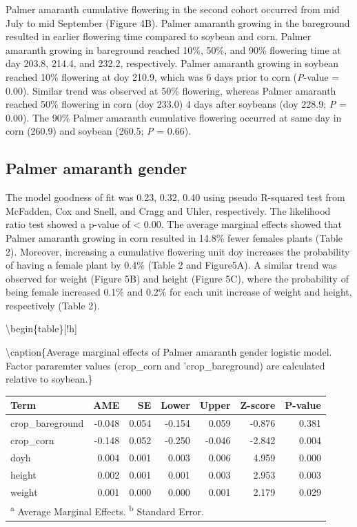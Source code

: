 \documentclass[utf8]{frontiersSCNS}
\begin{document}
Palmer amaranth cumulative flowering in the second cohort occurred from
mid July to mid September (Figure 4B). Palmer amaranth growing in the
bareground resulted in earlier flowering time compared to soybean and
corn. Palmer amaranth growing in bareground reached 10\%, 50\%, and 90\%
flowering time at day 203.8, 214.4, and 232.2, respectively. Palmer
amaranth growing in soybean reached 10\% flowering at doy 210.9, which
was 6 days prior to corn (\emph{P}-value = 0.00). Similar trend was
observed at 50\% flowering, whereas Palmer amaranth reached 50\%
flowering in corn (doy 233.0) 4 days after soybeans (doy 228.9; \emph{P}
= 0.00). The 90\% Palmer amaranth cumulative flowering occurred at same
day in corn (260.9) and soybean (260.5; \emph{P} = 0.66).

\hypertarget{palmer-amaranth-gender}{%
\subsection*{Palmer amaranth gender}\label{palmer-amaranth-gender}}

The model goodness of fit was 0.23, 0.32, 0.40 using pseudo R-squared
test from McFadden, Cox and Snell, and Cragg and Uhler, respectively.
The likelihood ratio test showed a p-value of \textless{} 0.00. The
average marginal effects showed that Palmer amaranth growing in corn
resulted in 14.8\% fewer females plants (Table 2). Moreover, increasing
a cumulative flowering unit doy increases the probability of having a
female plant by 0.4\% (Table 2 and Figure5A). A similar trend was
observed for weight (Figure 5B) and height (Figure 5C), where the
probability of being female increased 0.1\% and 0.2\% for each unit
increase of weight and height, respectively (Table 2).

\textbackslash begin\{table\}{[}!h{]}

\textbackslash caption\{\label{tab:unnamed-chunk-3}Average marginal
effects of Palmer amaranth gender logistic model. Factor pararemter
values (crop\_corn and 'crop\_bareground) are calculated relative to
soybean.\} \centering \fontsize{10}{12}\selectfont

\begin{tabular}[t]{lrrrrrr}
\toprule
Term & AME & SE & Lower & Upper & Z-score & P-value\\
\midrule
crop\_bareground & -0.048 & 0.054 & -0.154 & 0.059 & -0.876 & 0.381\\

crop\_corn & -0.148 & 0.052 & -0.250 & -0.046 & -2.842 & 0.004\\

doyh & 0.004 & 0.001 & 0.003 & 0.006 & 4.959 & 0.000\\

height & 0.002 & 0.001 & 0.001 & 0.003 & 2.953 & 0.003\\

weight & 0.001 & 0.000 & 0.000 & 0.001 & 2.179 & 0.029\\
\bottomrule
\multicolumn{7}{l}{\rule{0pt}{1em}\textsuperscript{a} Average Marginal Effects. \textsuperscript{b} Standard Error.}\\
\end{tabular}
\end{document}
